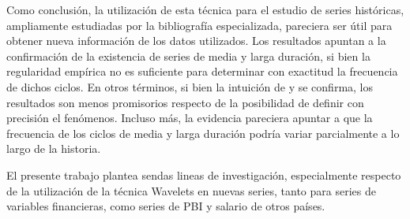 \documentclass[a4paper]{article}
\begin{document}
Como conclusión, la utilización de esta técnica para el estudio de series históricas, ampliamente estudiadas por la bibliografía especializada, pareciera ser útil para obtener nueva información de los datos utilizados. Los resultados apuntan a la confirmación de la existencia de series de media y larga duración, si bien la regularidad empírica no es suficiente para determinar con exactitud la frecuencia de dichos ciclos. En otros términos, si bien la intuición de \cite{kuznets1930secular} y \cite{kondratieff1979long} se confirma, los resultados son menos promisorios respecto de la posibilidad de definir con precisión el fenómenos. Incluso más, la evidencia pareciera apuntar a que la frecuencia de los ciclos de media y larga duración podría variar parcialmente a lo largo de la historia. 

El presente trabajo plantea sendas lineas de investigación, especialmente respecto de la utilización de la técnica Wavelets en nuevas series, tanto para series de variables financieras, como series de PBI y salario de otros países.



\end{document}
